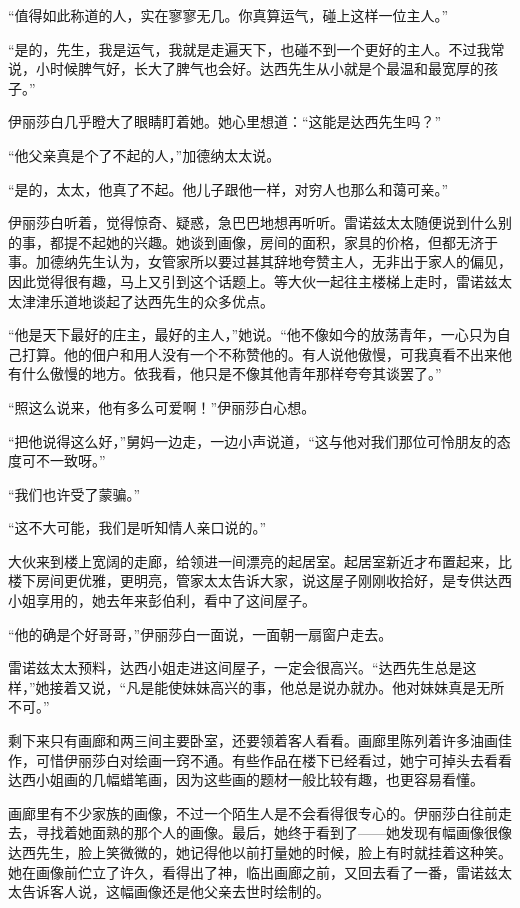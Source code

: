 \par “值得如此称道的人，实在寥寥无几。你真算运气，碰上这样一位主人。”
\par “是的，先生，我是运气，我就是走遍天下，也碰不到一个更好的主人。不过我常说，小时候脾气好，长大了脾气也会好。达西先生从小就是个最温和最宽厚的孩子。”
\par 伊丽莎白几乎瞪大了眼睛盯着她。她心里想道：“这能是达西先生吗？”
\par “他父亲真是个了不起的人，”加德纳太太说。
\par “是的，太太，他真了不起。他儿子跟他一样，对穷人也那么和蔼可亲。”
\par 伊丽莎白听着，觉得惊奇、疑惑，急巴巴地想再听听。雷诺兹太太随便说到什么别的事，都提不起她的兴趣。她谈到画像，房间的面积，家具的价格，但都无济于事。加德纳先生认为，女管家所以要过甚其辞地夸赞主人，无非出于家人的偏见，因此觉得很有趣，马上又引到这个话题上。等大伙一起往主楼梯上走时，雷诺兹太太津津乐道地谈起了达西先生的众多优点。
\par “他是天下最好的庄主，最好的主人，”她说。“他不像如今的放荡青年，一心只为自己打算。他的佃户和用人没有一个不称赞他的。有人说他傲慢，可我真看不出来他有什么傲慢的地方。依我看，他只是不像其他青年那样夸夸其谈罢了。”
\par “照这么说来，他有多么可爱啊！”伊丽莎白心想。
\par “把他说得这么好，”舅妈一边走，一边小声说道，“这与他对我们那位可怜朋友的态度可不一致呀。”
\par “我们也许受了蒙骗。”
\par “这不大可能，我们是听知情人亲口说的。”
\par 大伙来到楼上宽阔的走廊，给领进一间漂亮的起居室。起居室新近才布置起来，比楼下房间更优雅，更明亮，管家太太告诉大家，说这屋子刚刚收拾好，是专供达西小姐享用的，她去年来彭伯利，看中了这间屋子。
\par “他的确是个好哥哥，”伊丽莎白一面说，一面朝一扇窗户走去。
\par 雷诺兹太太预料，达西小姐走进这间屋子，一定会很高兴。“达西先生总是这样，”她接着又说，“凡是能使妹妹高兴的事，他总是说办就办。他对妹妹真是无所不可。”
\par 剩下来只有画廊和两三间主要卧室，还要领着客人看看。画廊里陈列着许多油画佳作，可惜伊丽莎白对绘画一窍不通。有些作品在楼下已经看过，她宁可掉头去看看达西小姐画的几幅蜡笔画，因为这些画的题材一般比较有趣，也更容易看懂。
\par 画廊里有不少家族的画像，不过一个陌生人是不会看得很专心的。伊丽莎白往前走去，寻找着她面熟的那个人的画像。最后，她终于看到了——她发现有幅画像很像达西先生，脸上笑微微的，她记得他以前打量她的时候，脸上有时就挂着这种笑。她在画像前伫立了许久，看得出了神，临出画廊之前，又回去看了一番，雷诺兹太太告诉客人说，这幅画像还是他父亲去世时绘制的。
